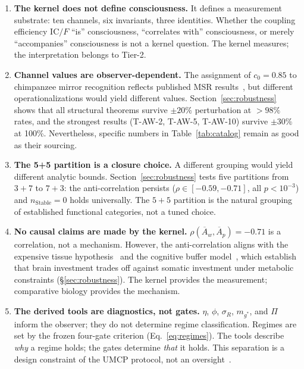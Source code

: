 \documentclass[
  aps,
  prd,
  twocolumn,
  superscriptaddress,
  nofootinbib,
  floatfix
]{revtex4-2}
\newcommand{\IC}{\mathrm{IC}}
\newcommand{\Aw}{\overline{A}_{\!w}}
\newcommand{\Ap}{\overline{A}_{\!p}}
\begin{document}
\begin{enumerate}
\item \textbf{The kernel does not define consciousness.}
  It defines a measurement substrate: ten channels, six
  invariants, three identities.  Whether the coupling
  efficiency $\IC/F$ ``is'' consciousness, ``correlates with''
  consciousness, or merely ``accompanies'' consciousness is
  not a kernel question.  The kernel measures; the
  interpretation belongs to Tier-2.

\item \textbf{Channel values are observer-dependent.}
  The assignment of $c_0 = 0.85$ to chimpanzee mirror
  recognition reflects published MSR
  results~\cite{gallup1970}, but different operationalizations
  would yield different values.  Section~\ref{sec:robustness}
  shows that all structural theorems survive $\pm 20\%$
  perturbation at $> 98\%$ rates, and the strongest results
  (T-AW-2, T-AW-5, T-AW-10) survive $\pm 30\%$
  at 100\%.  Nevertheless, specific numbers in
  Table~\ref{tab:catalog} remain as good as their sourcing.

\item \textbf{The 5+5 partition is a closure choice.}
  A different grouping would yield different analytic bounds.
  Section~\ref{sec:robustness} tests five partitions from
  $3\!+\!7$ to $7\!+\!3$: the anti-correlation persists
  ($\rho \in [-0.59, -0.71]$, all $p < 10^{-3}$) and
  $n_{\mathrm{Stable}} = 0$ holds universally.  The
  $5\!+\!5$ partition is the natural grouping of established
  functional categories, not a tuned choice.

\item \textbf{No causal claims are made by the kernel.}
  $\rho(\Aw, \Ap) = -0.71$ is a correlation, not a
  mechanism.  However, the anti-correlation aligns with
  the expensive tissue hypothesis~\cite{aiello1995expensive}
  and the cognitive buffer model~\cite{isler2009expensive},
  which establish that brain investment trades off against
  somatic investment under metabolic constraints
  (\S\ref{sec:robustness}).  The kernel provides the
  measurement; comparative biology provides the mechanism.

\item \textbf{The derived tools are diagnostics, not gates.}
  $\eta$, $\phi$, $\sigma_R$, $m_{g^*}$, and $\Pi$
  inform the observer; they do not determine regime
  classification.  Regimes are set by the frozen
  four-gate criterion (Eq.~\ref{eq:regimes}).  The
  tools describe \emph{why} a regime holds; the gates
  determine \emph{that} it holds.  This separation is
  a design constraint of the UMCP protocol, not an
  oversight~\cite{paulus2025umcp}.
\end{enumerate}
\end{document}
